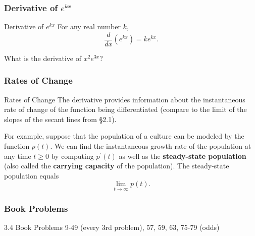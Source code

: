 \documentclass[cal1spr16Lectures.tex]{subfiles}
\begin{document}
\subsubsection{Derivative of $e^{kx}$}

\begin{frame}{\small Derivative of $e^{kx}$}
For any real number $k$,
\[\frac{d}{dx} \left( e^{kx} \right) = ke^{kx}.\]
\begin{exe}What is the derivative of $x^2 e^{3x}$? \end{exe}
\end{frame}

\subsubsection{Rates of Change}

\begin{frame}{\small Rates of Change}\footnotesize
The derivative provides information about the instantaneous rate of change of the function being differentiated (compare to the limit of the slopes of the secant lines from \S 2.1).

\vspace{1pc}
For example, suppose that the population of a culture can be modeled by the function $p(t)$.  We can find the instantaneous growth rate of the population at any time $t \ge 0$ by computing $p^{\prime}(t)$ as well as the \alert{\bf steady-state population} (also called the {\bf carrying capacity} of the population).  The steady-state population equals 
\[\lim_{t \to \infty} p(t).\]
\end{frame}

\subsubsection{Book Problems}

\begin{frame}{}
\begin{block}{3.4 Book Problems} 9-49 (every 3rd problem), 57, 59, 63, 75-79 (odds) \end{block} 
\end{frame}
\end{document}
